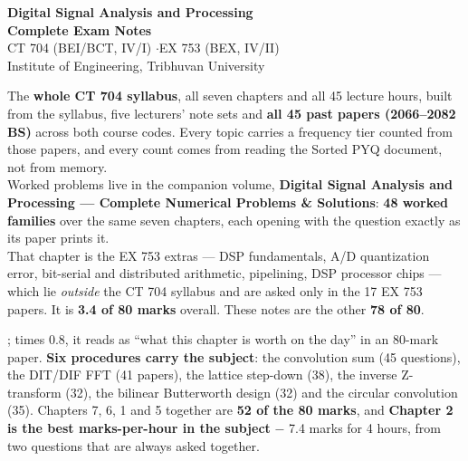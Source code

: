 \documentclass[10pt]{article}
\begin{document}
\thispagestyle{empty}
\vspace*{1.6cm}
\begin{center}
  {\Huge\bfseries\color{acc} Digital Signal Analysis and Processing}\\[6pt]
  {\LARGE\bfseries Complete Exam Notes}\\[14pt]
  {\large\color{sub} CT 704 (BEI/BCT, IV/I) \quad$\cdot$\quad EX 753 (BEX, IV/II)}\\[3pt]
  {\color{sub} Institute of Engineering, Tribhuvan University}\\[18pt]
  \begin{minipage}{0.80\textwidth}
    \color{sub}\small
    The \textbf{whole CT 704 syllabus}, all seven chapters and all 45 lecture hours,
    built from the syllabus, five lecturers' note sets and \textbf{all 45 past papers
    (2066--2082 BS)} across both course codes. Every topic carries a frequency tier
    counted from those papers, and every count comes from
     reading the Sorted PYQ document, not from memory.\\[8pt]
    Worked problems live in the companion volume, \textbf{Digital Signal Analysis and
    Processing --- Complete Numerical Problems \& Solutions}: \textbf{48 worked
    families} over the same seven chapters, each opening with the question exactly as
    its paper prints it.\\[8pt]
     That chapter is the EX 753 extras
    --- DSP fundamentals, A/D quantization error, bit-serial and distributed arithmetic,
    pipelining, DSP processor chips --- which lie \emph{outside} the CT 704 syllabus and
    are asked only in the 17 EX 753 papers. It is \textbf{3.4 of 80 marks} overall.
    These notes are the other \textbf{78 of 80}.
  \end{minipage}
\end{center}

\vfill


\par{}\vspace{10pt}
\begin{center}
\begin{minipage}{0.88\textwidth}\small\color{sub}
; times 0.8, it reads as
``what this chapter is worth on the day'' in an 80-mark paper. \textbf{Six procedures carry the subject}: the
convolution sum (45 questions), the DIT/DIF FFT (41 papers), the lattice step-down (38),
the inverse Z-transform (32), the bilinear Butterworth design (32) and the circular
convolution (35). Chapters 7, 6, 1 and 5 together are \textbf{52 of the 80 marks}, and
\textbf{Chapter 2 is the best marks-per-hour in the subject} $-$ 7.4 marks for 4 hours,
from two questions that are always asked together.
\end{minipage}
\end{center}
\vspace{1.0cm}
\end{document}
